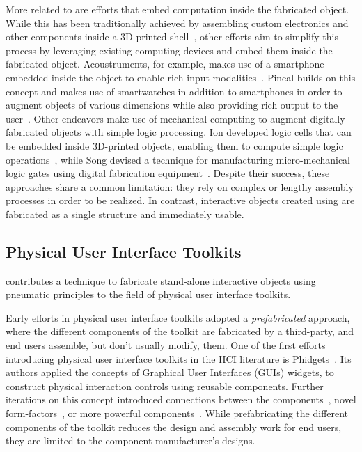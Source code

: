         More related to \al are efforts that embed computation inside the
        fabricated object. While this has been traditionally achieved by
        assembling custom electronics and other components inside a
        3D-printed shell~\cite{Murray-Smith:2008}, other efforts aim to
        simplify this process by leveraging existing computing devices and
        embed them inside the fabricated object. Acoustruments, for
        example, makes use of a smartphone embedded inside the object to
        enable rich input modalities~\cite{Laput:2015}. Pineal builds on
        this concept and makes use of smartwatches in addition to
        smartphones in order to augment objects of various dimensions while
        also providing rich output to the user~\cite{Ledo:2017}. Other
        endeavors make use of mechanical computing to augment digitally
        fabricated objects with simple logic processing. Ion \etal
        developed logic cells that can be embedded inside 3D-printed
        objects, enabling them to compute simple logic
        operations~\cite{Ion:2017}, while Song \etal devised a technique
        for manufacturing micro-mechanical logic gates using digital
        fabrication equipment~\cite{Song:2019}. Despite their success,
        these approaches share a common limitation: they rely on complex or
        lengthy assembly processes in order to be realized. In
        contrast, interactive objects created using \al are fabricated as a
        single structure and immediately usable.
        
      \subsection{Physical User Interface Toolkits}
        \al contributes a technique to fabricate stand-alone interactive
        objects using pneumatic principles to the field of physical user
        interface toolkits.

        Early efforts in physical user interface toolkits adopted a
        \emph{prefabricated} approach, where the different components of
        the toolkit are fabricated by a third-party, and end users
        assemble, but don't usually modify, them. One of the first efforts
        introducing physical user interface toolkits in the HCI literature
        is Phidgets~\cite{Greenberg:2001}. Its authors applied the concepts
        of Graphical User Interfaces (GUIs) widgets, to construct physical
        interaction controls using reusable components. Further iterations
        on this concept introduced connections between the
        components~\cite{Bdeir:2009}, novel
        form-factors~\cite{Hodges:2014}, or more powerful
        components~\cite{Villar:2012}. While prefabricating the different
        components of the toolkit reduces the design and assembly work for
        end users, they are limited to the component manufacturer's
        designs.
        
